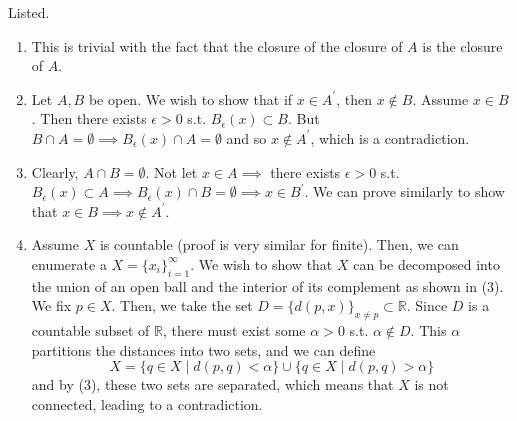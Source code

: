 \documentclass{article}
\begin{document}
    \begin{solution}
    Listed. 
    \begin{enumerate}
        \item This is trivial with the fact that the closure of the closure of $A$ is the closure of $A$. 
        \item Let $A, B$ be open. We wish to show that if $x \in A^\prime$, then $x \not\in B$. Assume $x \in B$. Then there exists $\epsilon > 0$ s.t. $B_\epsilon (x) \subset B$. But $B \cap A = \emptyset \implies B_\epsilon (x) \cap A = \emptyset$ and so $x \not\in A^\prime$, which is a contradiction. 

        \item Clearly, $A \cap B = \emptyset$. Not let $x \in A \implies$ there exists $\epsilon > 0$ s.t. $B_\epsilon (x) \subset A \implies B_\epsilon (x) \cap B = \emptyset \implies x \in B^\prime$. We can prove similarly to show that $x \in B \implies x \not\in A^\prime$. 

        \item Assume $X$ is countable (proof is very similar for finite). Then, we can enumerate a $X = \{x_i\}_{i=1}^\infty$. We wish to show that $X$ can be decomposed into the union of an open ball and the interior of its complement as shown in (3). We fix $p \in X$. Then, we take the set $D = \{d(p, x)\}_{x \neq p} \subset \mathbb{R}$. Since $D$ is a countable subset of $\mathbb{R}$, there must exist some $\alpha > 0$ s.t. $\alpha \not\in D$. This $\alpha$ partitions the distances into two sets, and we can define 
        \[X = \{q \in X \mid d(p, q) < \alpha\} \cup \{q \in X \mid d(p, q) > \alpha\}\]
        and by (3), these two sets are separated, which means that $X$ is not connected, leading to a contradiction. 
    \end{enumerate}
    \end{solution}
\end{document}
